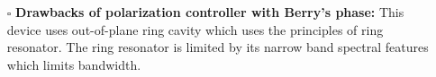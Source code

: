 \documentclass[../report.tex]{subfiles}
\begin{document}
\begin{itemize}[leftmargin=*]
		\item[$\square$] \textbf{Drawbacks of polarization controller with Berry's phase:}
		This device uses out-of-plane ring cavity which uses the principles of ring resonator. The ring resonator is limited by its narrow band spectral features which limits bandwidth.	
	\end{itemize}
	
\end{document}
